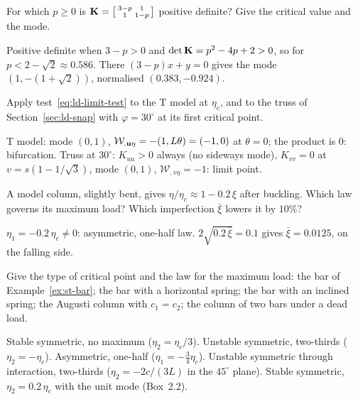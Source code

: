 \label{sec:ld-exo}

\label{exo:ld-hessian}
%
For which $p \ge 0$ is
$\mathbf{K} = \bigl[\begin{smallmatrix} 3 - p & 1 \\ 1 & 1 - p\end{smallmatrix}\bigr]$ positive
definite? Give the critical value and the mode.
\begin{solution}
Positive definite when $3 - p > 0$ and $\det\mathbf{K} = p^2 - 4p + 2 > 0$, so for
$p < 2 - \sqrt2 \approx 0.586$. There $(3 - p)x + y = 0$ gives the mode
$(1, -(1 + \sqrt2))$, normalised $(0.383, -0.924)$.
\end{solution}

\label{exo:ld-limitbif}
%
Apply test~\eqref{eq:ld-limit-test} to the T model at $\eta_c$, and to the truss of
Section~\ref{sec:ld-snap} with $\varphi = 30^\circ$ at its first critical point.
\begin{solution}
T model: mode $(0,1)$, $\mathcal{W}_{,\mathbf{u}\eta} = -(1, L\theta) = (-1, 0)$ at
$\theta = 0$; the product is $0$: bifurcation. Truss at $30^\circ$: $K_{uu} > 0$ always
(no sideways mode), $K_{vv} = 0$ at $v = s(1 - 1/\sqrt3)$, mode $(0,1)$,
$\mathcal{W}_{,v\eta} = -1$: limit point.
\end{solution}

\label{exo:ld-reading}
%
A model column, slightly bent, gives $\eta/\eta_c \approx 1 - 0.2\,\xi$ after
buckling. Which law governs its maximum load? Which imperfection $\bar\xi$ lowers it by $10\%$?
\begin{solution}
$\eta_1 = -0.2\,\eta_c \neq 0$: asymmetric, one-half law. $2\sqrt{0.2\,\bar\xi} = 0.1$
gives $\bar\xi = 0.0125$, on the falling side.
\end{solution}

\label{exo:ld-whichlaw}
Give the type of critical point and the law for the maximum load: the bar of
Example~\ref{ex:st-bar}; the bar with a horizontal spring; the bar with an inclined
spring; the Augusti column with $c_1 = c_2$; the column of two bars under a dead load.
\begin{solution}
Stable symmetric, no maximum ($\eta_2 = \eta_c/3$). Unstable symmetric, two-thirds
($\eta_2 = -\eta_c$). Asymmetric, one-half ($\eta_1 = -\tfrac34\eta_c$). Unstable
symmetric through interaction, two-thirds ($\eta_2 = -2c/(3L)$ in the $45^\circ$ plane).
Stable symmetric, $\eta_2 = 0.2\,\eta_c$ with the unit mode (Box~2.2).
\end{solution}


